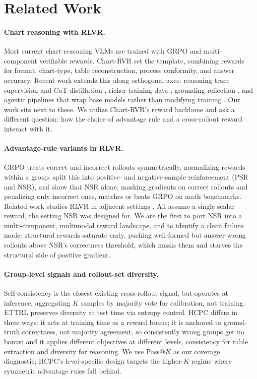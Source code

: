 \documentclass[11pt]{article}
\begin{document}
\section{Related Work}
\label{sec:related}

\paragraph{Chart reasoning with RLVR.}
Most current chart-reasoning VLMs are trained with GRPO and
multi-component verifiable rewards. Chart-RVR \citep{chartrvr2025}
set the template, combining rewards for format, chart-type,
table reconstruction, process conformity, and answer accuracy.
Recent work extends this along orthogonal axes: reasoning-trace
supervision and CoT distillation \citep{bigcharts2025,chartr12025},
richer training data \citep{chartgemma,chartinstruct}, grounding
reflection \citep{chartpoint2025}, and agentic pipelines that wrap
base models rather than modifying training
\citep{chartagent2025,vprochart2025,chartcitor2025}. Our work sits
next to these. We utilize Chart-RVR's reward backbone and ask
a different question: how the choice of advantage rule and a
cross-rollout reward interact with it.

\paragraph{Advantage-rule variants in RLVR.}
GRPO \citep{deepseekmath} treats correct and incorrect rollouts
symmetrically, normalizing rewards within a group.
\citet{zhu2025nsr} split this into positive- and negative-sample
reinforcement (PSR and NSR), and show that NSR alone, masking
gradients on correct rollouts and penalizing only incorrect ones,
matches or beats GRPO on math benchmarks. Related work studies RLVR
in adjacent settings \citep{su2025crossing,wen2025rlvr,rlvmr2025,
koksal2025fewshot}. All assume a single scalar reward, the setting
NSR was designed for. We are the first to port NSR into a
multi-component, multimodal reward landscape, and to identify a
clean failure mode: structural rewards saturate early, pushing
well-formed but answer-wrong rollouts above NSR's correctness
threshold, which masks them and starves the structural side of
positive gradient.

\paragraph{Group-level signals and rollout-set diversity.}
Self-consistency \citep{wang2022sc} is the closest existing
cross-rollout signal, but operates at inference, aggregating $K$
samples by majority vote for calibration, not training. ETTRL
\citep{ettrl2025} preserves diversity at test time via entropy
control. HCPC differs in three ways: it acts at training time as a
reward bonus; it is anchored to ground-truth correctness, not
majority agreement, so consistently wrong groups get no bonus; and
it applies different objectives at different levels, consistency for
table extraction and diversity for reasoning. We use Pass@$K$
\citep{passatk} as our coverage diagnostic; HCPC's level-specific
design targets the higher-$K$ regime where symmetric advantage rules
fall behind.
\end{document}
